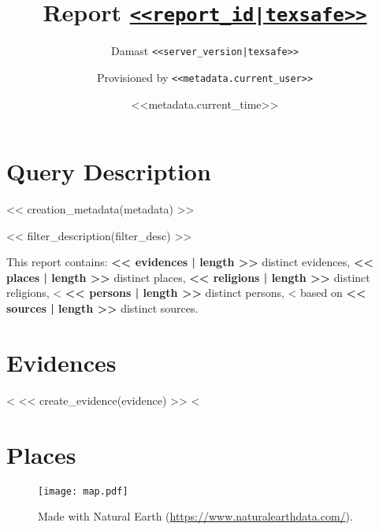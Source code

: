 \documentclass[fontsize=10pt,toc=chapterentrywithdots]{scrreprt}
\begin{document}
\title{Report \texttt{\href{<<report_url|texsafe>>}{<<report_id|texsafe>>}}}
\subtitle{Damast \texttt{<<server_version|texsafe>>}}
\date{<<metadata.current_time>>}
\author{Provisioned by \texttt{<<metadata.current_user>>}}
\publishers{Generated with Damast \\ \small{\url{https://github.com/UniStuttgart-VISUS/damast}}}

\maketitle

\pagestyle{scrheadings}
\cfoot*{}
\chead*{}
\ihead*{\textsc{\rightmark}}

\tableofcontents

\chapter{Query Description}
\label{sec:filters}

<< creation_metadata(metadata) >>

<< filter_description(filter_desc) >>

This report contains:
\textbf{<< evidences | length >>} distinct evidences,
\textbf{<< places | length >>} distinct places,
\textbf{<< religions | length >>} distinct religions,
<%
\textbf{<< persons | length >>} distinct persons,
<%
based on \textbf{<< sources | length >>} distinct sources.


\clearpage
\chapter{Evidences}
\label{sec:evidences}

<%
  << create_evidence(evidence) >>
<%


\clearpage
\chapter{Places}
\label{sec:places}

\begin{figure}[H]
  \texttt{[image: map.pdf]}
  \caption{Made with Natural Earth (\url{https://www.naturalearthdata.com/}).}
\end{figure}
\end{document}
